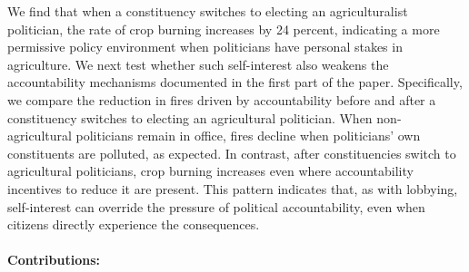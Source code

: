 \documentclass[12pt]{article}
\begin{document}
We find that when a constituency switches to electing an agriculturalist politician, the rate of crop burning increases by 24 percent, indicating a more permissive policy environment when politicians have personal stakes in agriculture.  We next test whether such self-interest also weakens the accountability mechanisms documented in the first part of the paper. Specifically, we compare the reduction in fires driven by accountability before and after a constituency switches to electing an agricultural politician. When non-agricultural politicians remain in office, fires decline when politicians' own constituents are polluted, as expected. In contrast, after constituencies switch to agricultural politicians, crop burning increases even where accountability incentives to reduce it are present. This pattern indicates that, as with lobbying,  self-interest can override the pressure of political accountability, even when citizens directly experience the consequences.



\paragraph{Contributions:}
\end{document}
